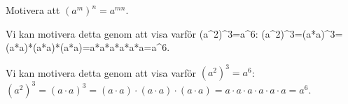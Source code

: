 \documentclass[titlepage]{article}
\begin{document}











\begin{center}
\begin{tcolorbox}[width=\linewidth,colback={white},title={\textbf{Exempel 1}},outer arc=0mm,colupper=black]
    Motivera att $(a^m)^n = a^{mn}$.
\end{tcolorbox} 
\end{center}

\begin{center}
\begin{tcolorbox}[width=\linewidth,colback={red!25!white},title={\textbf{Exempel 1: Lösning - Sämre}},outer arc=0mm,colupper=black]
    Vi kan motivera detta genom att visa varför (a\textasciicircum 2)\textasciicircum 3=a\textasciicircum 6:
    (a\textasciicircum 2)\textasciicircum 3=(a*a)\textasciicircum 3=(a*a)*(a*a)*(a*a)=a*a*a*a*a*a=a\textasciicircum 6.
\end{tcolorbox} 
\end{center}

\begin{center}
\begin{tcolorbox}[width=\linewidth,colback={green!25!white},title={\textbf{Exempel 1: Lösning - Bättre}},outer arc=0mm,colupper=black]
    Vi kan motivera detta genom att visa varför $(a^2)^3 = a^6$: \newline
    $(a^2)^3 = (a \cdot a)^3= (a \cdot a)\cdot (a \cdot a) \cdot (a \cdot a) = a \cdot a \cdot a \cdot a \cdot a \cdot a = a^6$.
\end{tcolorbox} 
\end{center}
\end{document}
